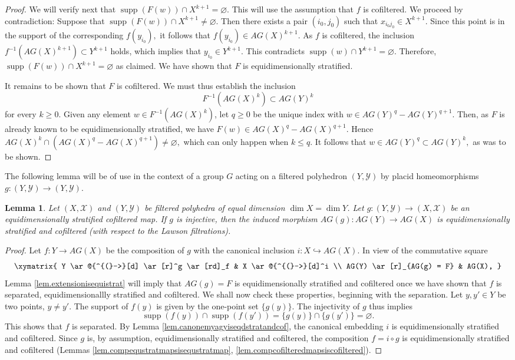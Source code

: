 \documentclass{amsart}
\newtheorem{lemma}[thm]{Lemma}
\theoremstyle{definition}
\theoremstyle{remark}
\newcommand {\Xa}    {\ensuremath{\mathcal{X}}}
\newcommand {\Ya}    {\ensuremath{\mathcal{Y}}}
\newcommand {\supp}  {\ensuremath{\operatorname{supp}}}
\begin{document}
\begin{proof}
We will verify next that $\supp (F(w)) \cap X^{k+1} = \varnothing$.
This will use the assumption that $f$ is cofiltered.
We proceed by contradiction:
Suppose that $\supp (F(w)) \cap X^{k+1} \not= \varnothing$.
Then there exists a pair $(i_0, j_0)$ such that  
$x_{i_0 j_0} \in X^{k+1}$.
Since this point is in the support of the corresponding $f(y_{i_0}),$
it follows that $f(y_{i_0}) \in AG(X)^{k+1}$.
As $f$ is cofiltered, the inclusion
$f^{-1} (AG(X)^{k+1}) \subset Y^{k+1}$ holds,
which implies that 
$y_{i_0} \in Y^{k+1}$.
This contradicts $\supp (w) \cap Y^{k+1} = \varnothing$.
Therefore, $\supp (F(w)) \cap X^{k+1} = \varnothing$ as claimed.
We have shown that $F$ is equidimensionally stratified.

It remains to be shown that $F$ is cofiltered.
We must thus establish the inclusion
\[ F^{-1} (AG(X)^k) \subset AG(Y)^k \] 
for every $k\geq 0$.
Given any element $w\in F^{-1} (AG(X)^k)$,
let $q\geq 0$ be the unique index with
$w\in AG(Y)^q - AG(Y)^{q+1}$.
Then, as $F$ is already known to be equidimensionally stratified,
we have $F(w) \in AG(X)^q - AG(X)^{q+1}$.
Hence $AG(X)^k \cap (AG(X)^q - AG(X)^{q+1}) \not= \varnothing,$
which can only happen when $k\leq q$.
It follows that $w \in AG(Y)^q \subset AG(Y)^k,$ as was to be shown.
\end{proof}


The following lemma will be of use in the context of a group
$G$ acting on a filtered polyhedron $(Y,\Ya)$ by placid homeomorphisms
$g: (Y,\Ya) \to (Y,\Ya)$.
\begin{lemma} \label{lem.aggequistratcofiltered}
Let $(X,\Xa)$ and $(Y,\Ya)$ be filtered polyhedra of equal dimension
$\dim X = \dim Y$.
Let $g: (Y,\Ya) \to (X,\Xa)$ be an equidimensionally stratified
cofiltered map. If $g$ is injective, 
then the induced morphism $AG(g): AG(Y) \to AG(X)$
is equidimensionally stratified and cofiltered
(with respect to the Lawson filtrations).
\end{lemma}
\begin{proof}
Let $f: Y \to AG(X)$ be the composition of $g$ with the
canonical inclusion $i: X \hookrightarrow AG(X)$.
In view of the commutative square
\[ \xymatrix{
Y \ar@{^{(}->}[d] \ar[r]^g \ar[rd]_f & X \ar@{^{(}->}[d]^i \\
AG(Y) \ar[r]_{AG(g) = F} & AG(X),
} \]
Lemma \ref{lem.extensionisequistrat} will imply that $AG(g)=F$ is equidimensionally
stratified and cofiltered once we have shown that 
$f$ is separated, equidimensionallly stratified and cofiltered.
We shall now check these properties, beginning with the separation.
Let $y,y' \in Y$ be two points, $y\not= y'$.
The support of $f(y)$ is given by the one-point set
$\{ g(y) \}$. The injectivity of $g$ thus implies
\[ \supp (f(y)) \cap \supp (f(y')) 
  = \{ g(y) \} \cap \{ g(y') \} = \varnothing.   \]
This shows that $f$ is separated.
By Lemma \ref{lem.canonemyagyiseqdstratandcof},
the canonical embedding
$i$ is equidimensionally stratified and cofiltered.
Since $g$ is, by assumption, equidimensionally stratified and cofiltered,
the composition $f=i\circ g$ is
equidimensionally stratified and cofiltered
(Lemmas \ref{lem.compequstratmapsisequstratmap}, 
\ref{lem.compcofilteredmapsiscofiltered}).
\end{proof}
\end{document}
